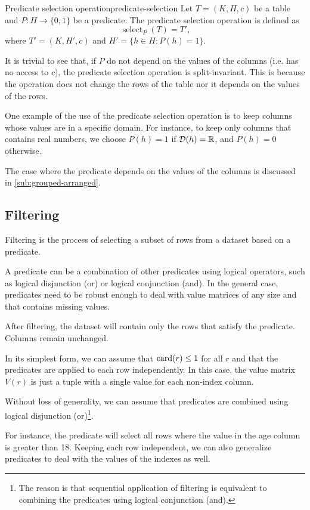 \begin{defbox}{Predicate selection operation}{predicate-selection}
  Let $T = (K, H, c)$ be a table and $P : H \to \{0, 1\}$ be a predicate.  The predicate
  selection operation is defined as \[
    \operatorname{select}_{P}(T) = T'\text{,}
  \] where $T' = (K, H', c)$ and $H' = \{h \in H : P(h) = 1\}$.
\end{defbox}

It is trivial to see that, if $P$ do not depend on the values of the columns (i.e. has no
access to $c$), the predicate selection operation is split-invariant.  This is because the
operation does not change the rows of the table nor it depends on the values of the rows.

One example of the use of the predicate selection operation is to keep columns whose
values are in a specific domain.  For instance, to keep only columns that contains real
numbers, we choose $P(h) = 1$ if $\domainof{h} = \mathbb{R}$, and $P(h) = 0$ otherwise.

The case where the predicate depends on the values of the columns is discussed in
\cref{sub:grouped-arranged}.

\subsection{Filtering}

Filtering is the process of selecting a subset of rows from a dataset based on a
predicate.

A predicate can be a combination of other predicates using logical operators, such as
logical disjunction (or) or logical conjunction (and).  In the general case, predicates
need to be robust enough to deal with value matrices of any size and that contains missing
values.

After filtering, the dataset will contain only the rows that satisfy the predicate.
Columns remain unchanged.

In its simplest form, we can assume that $\rowcard[r] \leq 1$ for all $r$ and that the
predicates are applied to each row independently.  In this case, the value matrix $V(r)$
is just a tuple with a single value for each non-index column.

Without loss of generality, we can assume that predicates are combined using logical
disjunction (or)\footnote{The reason is that sequential application of filtering is
equivalent to combining the predicates using logical conjunction (and).}.

For instance, the predicate  will select all rows where the value in the
age column is greater than 18.  Keeping each row independent, we can also generalize
predicates to deal with the values of the indexes as well.

